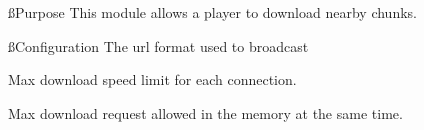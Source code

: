 
\ss{Purpose}
This module allows a player to download nearby chunks.

\ss{Configuration}
The url format used to broadcast


Max download speed limit for each connection.

Max download request allowed in the memory at the same time.


